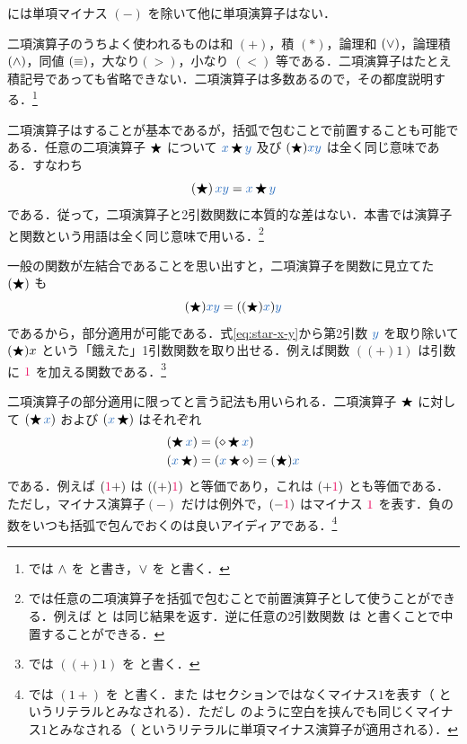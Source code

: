 \documentclass[a5paper,twoside,fleqn,draft]{jsbook}
\begin{document}
\haskell には単項マイナス $(-)$ を除いて他に単項演算子はない．

二項演算子のうちよく使われるものは和 $(+)$，積 $(*)$，論理和 $(\operatorname{\vee})$，論理積 $(\operatorname{\wedge})$，同値 $(\operatorname{\equiv})$，大なり$(>)$，小なり $(<)$ 等である．二項演算子はたとえ積記号であっても省略できない．二項演算子は多数あるので，その都度説明する．\footnote{\haskell では $\operatorname{\wedge}$ を \code{\&\&} と書き，$\operatorname{\vee}$ を \code{||} と書く．}

二項演算子はすることが基本であるが，括弧で包むことで前置することも可能である．任意の二項演算子 $\operatorname{\bigstar}$ について $\hVar{x}\hAnyBinOp\hVar{y}$ 及び $(\hAnyBinOp)\hVar{x}\hVar{y}$ は全く同じ意味である．すなわち
\begin{equation}
  \left(\hAnyBinOp\right)\hVar{x}\hVar{y}
  =\hVar{x}\hAnyBinOp\hVar{y}
\end{equation}
である．従って，二項演算子と2引数関数に本質的な差はない．本書では演算子と関数という用語は全く同じ意味で用いる．\footnote{\haskell では任意の二項演算子を括弧で包むことで前置演算子として使うことができる．例えば と  は同じ結果を返す．逆に任意の2引数関数 は  と書くことで中置することができる．}

一般の関数が左結合であることを思い出すと，二項演算子を関数に見立てた
$(\operatorname{\bigstar})$ も
\begin{equation}
  \label{eq:star-x-y}
  (\hAnyBinOp)\hVar{x}\hVar{y}
  =((\hAnyBinOp)\hVar{x})\hVar{y}
\end{equation}
であるから，部分適用が可能である．式\eqref{eq:star-x-y}から第2引数 $\hVar{y}$ を取り除いて $(\operatorname{\bigstar})x$ という「餓えた」1引数関数を取り出せる．例えば関数 $((+)1)$ は引数に $\hConstant{1}$ を加える関数である．\footnote{\haskell では $((+)1)$ を  と書く．}

\separator

二項演算子の部分適用に限ってと言う記法も用いられる．二項演算子 $\operatorname{\bigstar}$ に対して $(\hAnyBinOp\hVar{x})$ および $(\hVar{x}\hAnyBinOp)$ はそれぞれ
\begin{align}
  (\hAnyBinOp\hVar{x})
  &=(\hAnonParam\hAnyBinOp\hVar{x})\\
  (\hVar{x}\hAnyBinOp)
  &=(\hVar{x}\hAnyBinOp\hAnonParam)=(\hAnyBinOp)\hVar{x}
\end{align}
である．例えば $(\hConstant{1}+)$ は $((+)\hConstant{1})$ と等価であり，これは $(+\hConstant{1})$ とも等価である．ただし，マイナス演算子$(-)$ だけは例外で，$(-\hConstant{1})$ はマイナス $\hConstant{1}$ を表す．負の数をいつも括弧で包んでおくのは良いアイディアである．\footnote{\haskell では $(1+)$ を と書く．また  はセクションではなくマイナス$1$を表す（ というリテラルとみなされる）．ただし のように空白を挟んでも同じくマイナス$1$とみなされる（ というリテラルに単項マイナス演算子が適用される）．}
\end{document}
